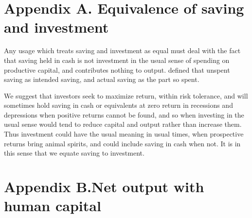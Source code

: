 \documentclass[a4paper,fleqn]{latex_styles/cas-sc}
\begin{document}
\appendix
\renewcommand{\theequation}{A.\arabic{equation}}
\setcounter{equation}{0}

\hypertarget{appendix-a}{
\section*{Appendix A. \hspace{0.5em}Equivalence of saving and investment}\label{appendix-a}
}

Any usage which treats saving and investment as equal must deal with the fact that saving held in cash is not investment in the usual sense of spending on productive capital, and contributes nothing to output. \cite{keynesGeneralTheoryEmployment1936} defined that unspent saving as intended saving, and actual saving as the part so spent.

We suggest that investors seek to maximize return, within risk tolerance, and will sometimes hold saving in cash or equivalents at zero return in recessions and depressions when positive returns cannot be found, and so when investing in the usual sense would tend to reduce capital and output rather than increase them. Thus investment could have the usual meaning in usual times, when prospective returns bring animal spirits, and could include saving in cash when not. It is in this sense that we equate saving to investment.

\renewcommand{\theequation}{B.\arabic{equation}}
\setcounter{equation}{0}

\hypertarget{appendix}{%
\section*{Appendix B.\hspace{0.5em}Net output with human
capital}\label{appendix}}
\end{document}

